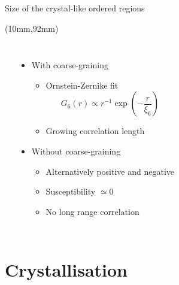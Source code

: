 \begin{frame}{Size of the crystal-like ordered regions}
	\begin{textblock*}{0.6\textwidth}(10mm,92mm)
		\simplephasediagram{}
	\end{textblock*}
	\begin{columns}
	\resizebox{\columnwidth}{!}{\begin{LARGE}\end{LARGE}}\\
	\resizebox{\columnwidth}{!}{\begin{LARGE}\end{LARGE}}
	\begin{itemize}
		\item With coarse-graining
		\begin{itemize}
			\item Ornstein-Zernike fit
			\[ G_6(r) \propto r^{-1}\exp( -\frac{r}{\xi_6} )\]
			\item Growing correlation length
		\end{itemize}
		
		\bigskip
		\item Without coarse-graining
		\begin{itemize}
			\item Alternatively positive and negative
			\item Susceptibility $\simeq 0$
			\item No long range correlation
		\end{itemize}
	\end{itemize}
	\end{columns}
\end{frame}

\section{Crystallisation}

